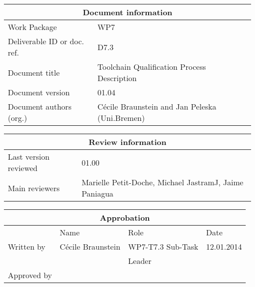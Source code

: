 \documentclass{openetcs_report}
\begin{document}
\begin{tabular}{|p{4.4cm}|p{8.7cm}|}
\hline
\multicolumn{2}{|c|}{Document information} \\
\hline
Work Package &  WP7  \\
Deliverable ID or doc. ref. & D7.3\\
\hline
Document title & Toolchain Qualification Process Description \\
Document version & 01.04 \\
Document authors (org.)  & Cécile Braunstein and Jan Peleska (Uni.Bremen) \\
\hline
\end{tabular}

\begin{tabular}{|p{4.4cm}|p{8.7cm}|}
\hline
\multicolumn{2}{|c|}{Review information} \\
\hline
Last version reviewed & 01.00 \\
\hline
Main reviewers &  Marielle Petit-Doche, Michael JastramJ, Jaime Paniagua\\
\hline
\end{tabular}

\begin{tabular}{|p{2.2cm}|p{4cm}|p{4cm}|p{2cm}|}
\hline
\multicolumn{4}{|c|}{Approbation} \\
\hline
  &  Name & Role & Date   \\
\hline  
Written by    &  Cécile Braunstein & WP7-T7.3 Sub-Task  & 12.01.2014 \\
&  & Leader&\\
\hline
Approved by &  &   &  \\
\hline
\end{tabular}
\end{document}
